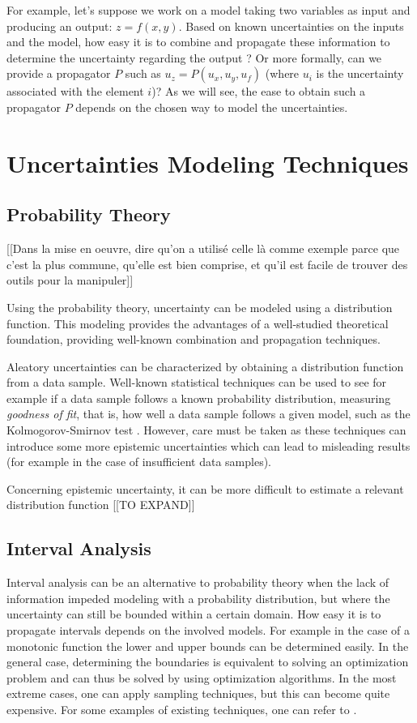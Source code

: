 For example, let's suppose we work on a model taking two variables as input and producing an output: $z=f(x,y)$.
Based on known uncertainties on the inputs and the model, how easy it is to combine and propagate these information to determine the uncertainty regarding the output ? Or more formally, can we provide a propagator $P$ such as $u_z = P(u_x, u_y, u_f)$ (where $u_i$ is the uncertainty associated with the element $i$)? As we will see, the ease to obtain such a propagator $P$ depends on the chosen way to model the uncertainties.

\section{Uncertainties Modeling Techniques}

\subsection{Probability Theory}

[[Dans la mise en oeuvre, dire qu'on a utilisé celle là comme exemple parce que c'est la plus commune, qu'elle est bien comprise, et qu'il est facile de trouver des outils pour la manipuler]]

Using the probability theory, uncertainty can be modeled using a distribution function. This modeling provides the advantages of a well-studied theoretical foundation, providing well-known combination and propagation techniques.

Aleatory uncertainties can be characterized by obtaining a distribution function from a data sample.
Well-known statistical techniques can be used to see for example if a data sample follows a known probability distribution, measuring \emph{goodness of fit}, that is, how well a data sample follows a given model, such as the Kolmogorov-Smirnov test \cite{Massey_1951}. 
However, care must be taken as these techniques can introduce some more epistemic uncertainties which can lead to misleading results (for example in the case of insufficient data samples).

Concerning epistemic uncertainty, it can be more difficult to estimate a relevant distribution function  [[TO EXPAND]]

\subsection{Interval Analysis}

Interval analysis can be an alternative to probability theory when the lack of information impeded modeling with a probability distribution, but where the uncertainty can still be bounded within a certain domain.
How easy it is to propagate intervals depends on the involved models. For example in the case of a monotonic function the lower and upper bounds can be determined easily. In the general case, determining the boundaries is equivalent to solving an optimization problem and can thus be solved by using optimization algorithms. In the most extreme cases, one can apply sampling techniques, but this can become quite expensive.
For some examples of existing techniques, one can refer to \cite{Kreinovich_2008}.

